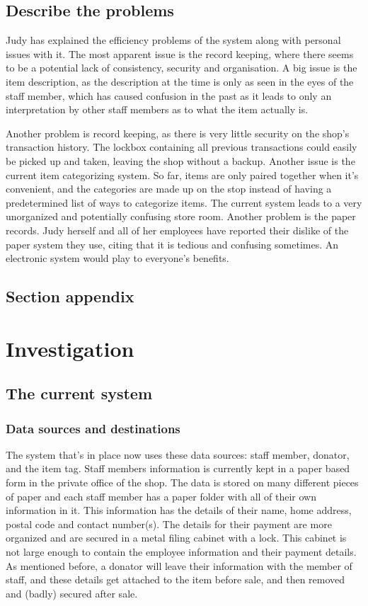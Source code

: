 \subsection{Describe the problems}
Judy has explained the efficiency problems of the system along with personal issues with it. The most apparent issue is the record keeping, where there seems to be a potential lack of consistency, security and organisation. A big issue is the item description, as the description at the time is only as seen in the eyes of the staff member, which has caused confusion in the past as it leads to only an interpretation by other staff members as to what the item actually is. 

Another problem is record keeping, as there is very little security on the shop's transaction history. The lockbox containing all previous transactions could easily be picked up and taken, leaving the shop without a backup. Another issue is the current item categorizing system. So far, items are only paired together when it's convenient, and the categories are made up on the stop instead of having a predetermined list of ways to categorize items. The current system leads to a very unorganized and potentially confusing store room. Another problem is the paper records. Judy herself and all of her employees have reported their dislike of the paper system they use, citing that it is tedious and confusing sometimes. An electronic system would play to everyone's benefits.
\subsection{Section appendix}

\section{Investigation}

\subsection{The current system}

\subsubsection{Data sources and destinations}
The system that’s in place now uses these data sources: staff member, donator, and the item tag.
 Staff members information is currently kept in a paper based form in the private office of the shop. The data is stored on many different pieces of paper and each staff member has a paper folder with all of their own information in it. This information has the details of their name, home address, postal code and contact number(s). The details for their payment are more organized and are secured in a metal filing cabinet with a lock. This cabinet is not large enough to contain the employee information and their payment details. As mentioned before, a donator will leave their information with the member of staff, and these details get attached to the item before sale, and then removed and (badly) secured after sale.

